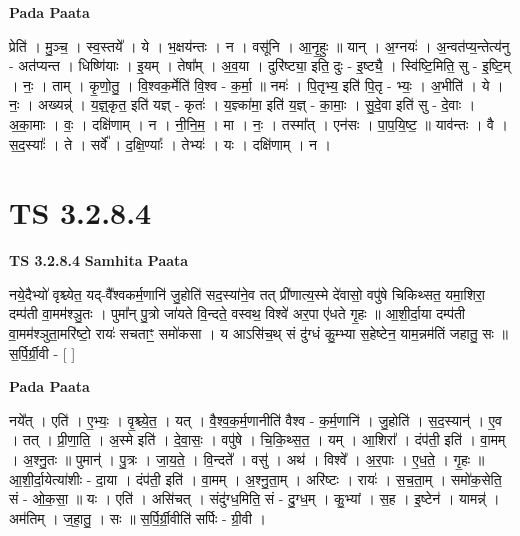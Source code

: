 \documentclass[17pt]{extarticle}
\begin{document}
\textbf{Pada Paata} \newline

प्रेति॑ । मु॒ञ्च॒ । स्व॒स्तये᳚ । ये । भ॒क्षय॑न्तः । न । वसू॑नि । आ॒नृ॒हुः ॥ यान् । अ॒ग्नयः॑ । अ॒न्वत॑प्य॒न्तेत्य॑नु - अत॑प्यन्त । धिष्णि॑याः । इ॒यम् । तेषा᳚म् । अ॒व॒या । दुरि॑ष्ट्या॒ इति॒ दुः - इ॒ष्ट्यै॒ । स्वि॑ष्टि॒मिति॒ सु - इ॒ष्टि॒म् । नः॒ । ताम् । कृ॒णो॒तु॒ । वि॒श्वक॒र्मेति॑ वि॒श्व - क॒र्मा॒ ॥ नमः॑ । पि॒तृभ्य॒ इति॑ पि॒तृ - भ्यः॒ । अ॒भीति॑ । ये । नः॒ । अख्यन्न्॑ । य॒ज्ञ्॒कृत॒ इति॑ यज्ञ् - कृतः॑ । य॒ज्ञ्का॑मा॒ इति॑ य॒ज्ञ् - का॒माः॒ । सु॒दे॒वा इति॑ सु - दे॒वाः । अ॒का॒माः । वः॒ । दक्षि॑णाम् । न । नी॒नि॒म॒ । मा । नः॒ । तस्मा᳚त् । एन॑सः । पा॒प॒यि॒ष्ट॒ ॥ याव॑न्तः । वै । स॒द॒स्याः᳚ । ते । सर्वे᳚ । द॒क्षि॒ण्याः᳚ । तेभ्यः॑ । यः । दक्षि॑णाम् । न ।  \newline





\section{ TS 3.2.8.4 }

\textbf{TS 3.2.8.4 } \newline
\textbf{Samhita Paata} \newline

नये॒दैभ्यो॑ वृश्च्येत॒ यद्-वै᳚श्वकर्म॒णानि॑ जु॒होति॑ सद॒स्या॑ने॒व तत् प्री॑णात्य॒स्मे दे॑वासो॒ वपु॑षे चिकिथ्सत॒ यमा॒शिरा॒ दम्प॑ती वा॒मम॑श्ञु॒तः । पुमा᳚न् पु॒त्रो जा॑यते वि॒न्दते॒ वस्वथ॒ विश्वे॑ अर॒पा ए॑धते गृ॒हः ॥ आ॒शी॒र्दा॒या दम्प॑ती वा॒मम॑श्ञुता॒मरि॑ष्टो॒ रायः॑ सचताꣳ॒॒ समो॑कसा । य आऽसि॑च॒थ् सं दु॑ग्धं कु॒म्भ्या स॒हेष्टेन॒ याम॒न्नम॑तिं जहातु॒ सः ॥ स॒र्पि॒र्ग्री॒वी - [  ] \newline

\textbf{Pada Paata} \newline

नये᳚त् । एति॑ । ए॒भ्यः॒ । वृ॒श्च्ये॒त॒ । यत् । वै॒श्व॒क॒र्म॒णानीति॑ वैश्व - क॒र्म॒णानि॑ । जु॒होति॑ । स॒द॒स्यान्॑ । ए॒व । तत् । प्री॒णा॒ति॒ । अ॒स्मे इति॑ । दे॒वा॒सः॒ । वपु॑षे । चि॒कि॒थ्स॒त॒ । यम् । आ॒शिरा᳚ । दंप॑ती॒ इति॑ । वा॒मम् । अ॒श्नु॒तः ॥ पुमान्॑ । पु॒त्रः । जा॒य॒ते॒ । वि॒न्दते᳚ । वसु॑ । अथ॑ । विश्वे᳚ । अ॒र॒पाः । ए॒ध॒ते॒ । गृ॒हः ॥ आ॒शी॒र्दा॒येत्या॑शीः - दा॒या । दंप॑ती॒ इति॑ । वा॒मम् । अ॒श्नु॒ता॒म् । अरि॑ष्टः । रायः॑ । स॒च॒ता॒म् । समो॑क॒सेति॒ सं - ओ॒क॒सा॒ ॥ यः । एति॑ । असि॑चत् । संदु॑ग्ध॒मिति॒ सं - दु॒ग्ध॒म् । कु॒भ्यां । स॒ह । इ॒ष्टेन॑ । यामन्न्॑ । अम॑तिम् । ज॒हा॒तु॒ । सः ॥ स॒र्पि॒र्ग्री॒वीति॑ सर्पिः - ग्री॒वी ।  \newline
\end{document}
